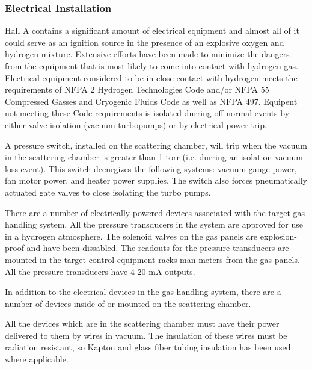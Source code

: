 \begin{safetyen}{10}{5}
{\subsubsection{Electrical Installation}

Hall A contains a significant amount of electrical equipment and almost
all of it could serve as an ignition source in the presence of an
explosive oxygen and hydrogen mixture. Extensive efforts have been
made to minimize the dangers from the equipment that is most likely
to come into contact with hydrogen gas. Electrical equipment considered
to be in close contact with hydrogen meets the requirements of NFPA
2 Hydrogen Technologies Code and/or NFPA 55 Compressed Gasses and
Cryogenic Fluids Code as well as NFPA 497. Equipent not meeting these
Code requirements is isolated durring off normal events by either
valve isolation (vacuum turbopumps) or by electrical power trip.

A pressure switch, installed on the scattering chamber, will trip
when the vacuum in the scattering chamber is greater than 1 torr (i.e.
durring an isolation vacuum loss event). This switch deenrgizes the
following systems: vacuum gauge power, fan motor power, and heater
power supplies. The switch also forces pneumatically actuated gate
valves to close isolating the turbo pumps.

There are a number of electrically powered devices associated with
the target gas handling system. All the pressure transducers in the
system are approved for use in a hydrogen atmosphere. The solenoid
valves on the gas panels are explosion-proof and have been dissabled.
The readouts for the pressure transducers are mounted in the target
control equipment racks man meters from the gas panels. All the pressure
transducers have 4-20 mA outputs.

In addition to the electrical devices in the gas handling system,
there are a number of devices inside of or mounted on the scattering
chamber.

All the devices which are in the scattering chamber must have their
power delivered to them by wires in vacuum. The insulation of these
wires must be radiation resistant, so Kapton and glass fiber tubing
insulation has been used where applicable.

}
\end{safetyen}
